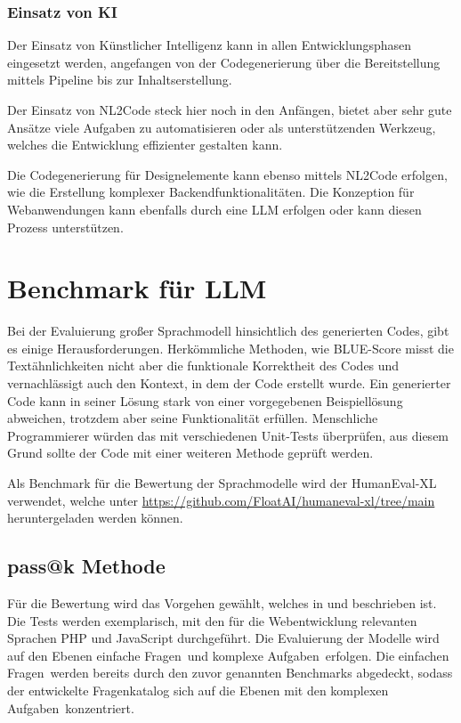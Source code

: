 \subsubsection{Einsatz von KI}
Der Einsatz von Künstlicher Intelligenz kann in allen Entwicklungsphasen eingesetzt werden, angefangen von der Codegenerierung über die Bereitstellung mittels Pipeline bis zur Inhaltserstellung.\vspace{0.2cm}

Der Einsatz von \acrshort{NL2Code} steck hier noch in den Anfängen, bietet aber sehr gute Ansätze viele Aufgaben zu automatisieren oder als unterstützenden Werkzeug, welches die Entwicklung effizienter gestalten kann.\vspace{0.2cm}

Die Codegenerierung für Designelemente kann ebenso mittels NL2Code erfolgen, wie die Erstellung komplexer Backendfunktionalitäten. Die Konzeption für Webanwendungen kann ebenfalls durch eine LLM erfolgen oder kann diesen Prozess unterstützen.



\section{Benchmark für LLM}
Bei der Evaluierung großer Sprachmodell hinsichtlich des generierten Codes, gibt es einige Herausforderungen. Herkömmliche Methoden, wie BLUE-Score misst die Textähnlichkeiten nicht aber die funktionale Korrektheit des Codes und vernachlässigt auch den Kontext, in dem der Code erstellt wurde. Ein generierter Code kann in seiner Lösung stark von einer vorgegebenen Beispiellösung abweichen, trotzdem aber seine Funktionalität erfüllen. Menschliche Programmierer würden das mit verschiedenen Unit-Tests überprüfen, aus diesem Grund sollte der Code mit einer weiteren Methode geprüft werden.\vspace{0.2cm}

Als Benchmark für die Bewertung der Sprachmodelle wird der HumanEval-XL verwendet, welche unter \href{https://github.com/FloatAI/humaneval-xl/tree/main}{https://github.com/FloatAI/humaneval-xl/tree/main} heruntergeladen werden können.


\subsection{pass@k Methode}\label{subsec:pass_at_k}
Für die Bewertung wird das Vorgehen gewählt, welches in \cite{chen-2021} und \cite{peng-2024} beschrieben ist. Die Tests werden exemplarisch, mit den für die Webentwicklung relevanten Sprachen PHP und JavaScript durchgeführt. Die Evaluierung der Modelle wird auf den Ebenen \glqq einfache Fragen\grqq \ und \glqq komplexe Aufgaben\grqq \ erfolgen. Die \glqq einfachen Fragen\grqq \ werden bereits durch den zuvor genannten Benchmarks abgedeckt, sodass der entwickelte Fragenkatalog sich auf die Ebenen mit den \glqq komplexen Aufgaben\grqq \ konzentriert.\vspace{0.2cm}

